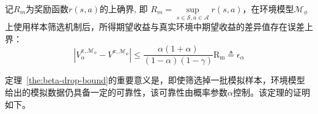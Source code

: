 \begin{theorem}\label{the:beta-drop-bound}

记$R_{m}$为奖励函数$r(s,a)$的上确界, 即 $R_{m}=\underset{s\in\mathcal{S},a\in\mathcal{A}}{\sup}r(s,a)$，在环境模型$\mathcal{M}_\phi$上使用样本筛选机制后，所得期望收益与真实环境中期望收益的差异值存在误差上界：
\begin{equation}
    |{V}_\alpha^{\pi, \mathcal{M}_{\phi}} - {V}^{\pi,\mathcal{M}_{\phi}}| \leq \frac{\alpha(1+\alpha)}{(1-\alpha)(1-\gamma)}\mathrm{R_{m}} \triangleq \epsilon_\alpha
\label{eq:eps-beta}
\end{equation}
\end{theorem}

定理~\ref{the:beta-drop-bound}的重要意义是，即使筛选掉一批模拟样本，环境模型给出的模拟数据仍具备一定的可靠性，该可靠性由概率参数$\alpha$控制。该定理的证明如下。

